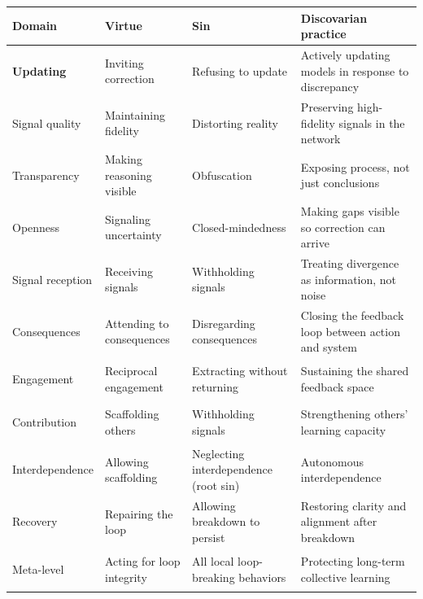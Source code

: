 \documentclass[12pt, a4paper]{article}
\begin{document}
\begin{longtable}{>{\bfseries}p{3cm} p{4cm} p{4cm} p{4cm}}
\toprule
\textbf{Domain} & \textbf{Virtue} & \textbf{Sin} & \textbf{Discovarian practice} \\
\midrule
\endhead

Updating &
Inviting correction &
Refusing to update &
Actively updating models in response to discrepancy \\
\addlinespace

Signal quality &
Maintaining fidelity &
Distorting reality &
Preserving high-fidelity signals in the network \\
\addlinespace

Transparency &
Making reasoning visible &
Obfuscation &
Exposing process, not just conclusions \\
\addlinespace

Openness &
Signaling uncertainty &
Closed-mindedness &
Making gaps visible so correction can arrive \\
\addlinespace

Signal reception &
Receiving signals &
Withholding signals &
Treating divergence as information, not noise \\
\addlinespace

Consequences &
Attending to consequences &
Disregarding consequences &
Closing the feedback loop between action and system \\
\addlinespace

Engagement &
Reciprocal engagement &
Extracting without returning &
Sustaining the shared feedback space \\
\addlinespace

Contribution &
Scaffolding others &
Withholding signals &
Strengthening others' learning capacity \\
\addlinespace

Interdependence &
Allowing scaffolding &
Neglecting interdependence (root sin) &
Autonomous interdependence \\
\addlinespace

Recovery &
Repairing the loop &
Allowing breakdown to persist &
Restoring clarity and alignment after breakdown \\
\addlinespace

Meta-level &
Acting for loop integrity &
All local loop-breaking behaviors &
Protecting long-term collective learning \\

\bottomrule
\end{longtable}
\end{document}
